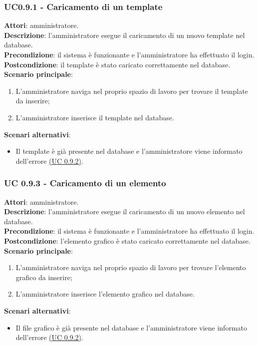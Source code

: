 \subsubsection{UC0.9.1 - Caricamento di un template}{
	\label{uc0.9.1}
	\textbf{Attori}: amministratore. \\
	\textbf{Descrizione}: l'amministratore esegue il caricamento di un nuovo template nel database. \\
	\textbf{Precondizione}: il sistema  è funzionante e l'amministratore ha effettuato il login.	\\
	\textbf{Postcondizione}: il template è stato caricato correttamente nel database.	\\
	\textbf{Scenario principale}:
	\begin{enumerate}
		\item L'amministratore naviga nel proprio spazio di lavoro  per trovare il template da inserire;
		\item L'amministratore inserisce il template nel database.
	\end{enumerate}
	\textbf{Scenari alternativi}:
	\begin{itemize}
		\item Il template è già presente nel database e l'amministratore viene informato dell'errore \hyperref[uc0.9.2]{(UC 0.9.2)}.
	\end{itemize}
	}
\subsubsection{UC 0.9.3 - Caricamento di un elemento}{
	\label{uc0.9.3}
	\textbf{Attori}: amministratore. \\
	\textbf{Descrizione}: l'amministratore esegue il caricamento di un nuovo elemento nel database. \\
	\textbf{Precondizione}: il sistema  è funzionante e l'amministratore ha effettuato il login.	\\
	\textbf{Postcondizione}: l'elemento grafico è stato caricato correttamente nel database.	\\
	\textbf{Scenario principale}:
	\begin{enumerate}
		\item L'amministratore naviga nel proprio spazio di lavoro per trovare l'elemento grafico da inserire;
		\item L'amministratore inserisce l'elemento grafico nel database.
	\end{enumerate}
	\textbf{Scenari alternativi}:
	\begin{itemize}
		\item Il file grafico è già presente nel database e l'amministratore viene informato dell'errore \hyperref[uc0.9.2]{(UC 0.9.2)}.
	\end{itemize}
	}
